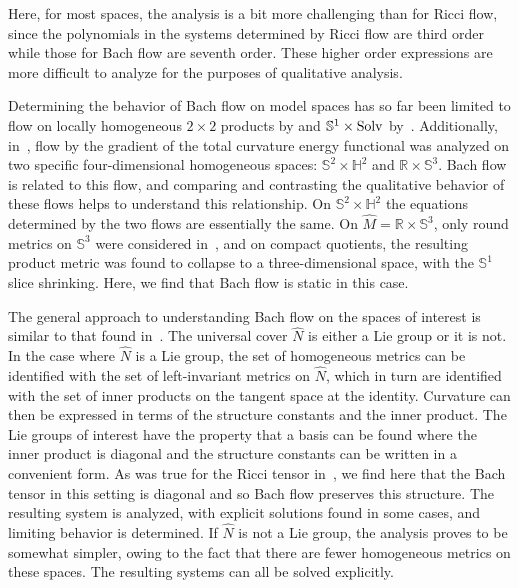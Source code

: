 \documentclass[pdftex]{sigma}
\numberwithin{equation}{section}
\begin{document}
Here, for most spaces, the analysis is a bit more challenging than for Ricci flow, since the polynomials in the systems determined by Ricci flow are third order while those for Bach flow are seventh order. These higher order expressions are more difficult to analyze for the purposes of qualitative analysis.

Determining the behavior of Bach flow on model spaces has so far been limited to flow on locally homogeneous $2 \times 2$ products by \cite{DasKar} and $\mathbb{S}^1 \times {\rm Solv}$ by~\cite{Ho}. Additionally, in~\cite{Streets}, flow by the gradient of the total curvature energy functional was analyzed on two specific four-dimensional homogeneous spaces: $\mathbb{S}^2 \times \mathbb{H}^2$ and $\mathbb{R} \times \mathbb{S}^3$. Bach flow is related to this flow, and comparing and contrasting the qualitative behavior of these flows helps to understand this relationship. On $\mathbb{S}^2 \times \mathbb{H}^2$ the equations determined by the two flows are essentially the same. On $\widehat{M} = \mathbb{R} \times \mathbb{S}^3$, only round metrics on $\mathbb{S}^3$ were considered in~\cite{Streets}, and on compact quotients, the resulting product metric was found to collapse to a three-dimensional space, with the $\mathbb{S}^1$ slice shrinking. Here, we find that Bach flow is static in this case.

The general approach to understanding Bach flow on the spaces of interest is similar to that found in~\cite{IJ}. The universal cover $\widehat{N}$ is either a Lie group or it is not. In the case where $\widehat{N}$ is a Lie group, the set of homogeneous metrics can be identified with the set of left-invariant metrics on $\widehat{N}$, which in turn are identified with the set of inner products on the tangent space at the identity. Curvature can then be expressed in terms of the structure constants and the inner product. The Lie groups of interest have the property that a basis can be found where the inner product is diagonal and the structure constants can be written in a convenient form. As was true for the Ricci tensor in~\cite{IJ}, we find here that the Bach tensor in this setting is diagonal and so Bach flow preserves this structure. The resulting system is analyzed, with explicit solutions found in some cases, and limiting behavior is determined. If $\widehat{N}$ is not a Lie group, the analysis proves to be somewhat simpler, owing to the fact that there are fewer homogeneous metrics on these spaces. The resulting systems can all be solved explicitly.
\end{document}
